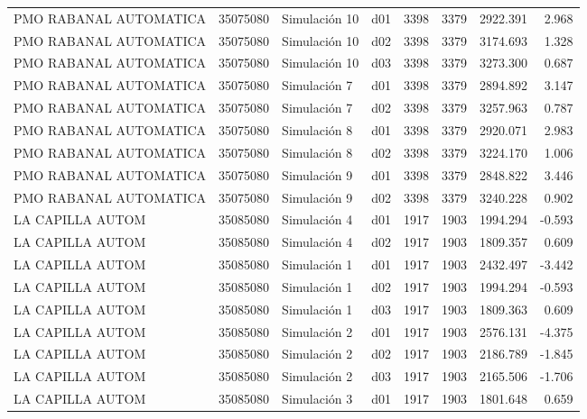\begin{landscape}
\begin{longtable}{lrlp{2cm}p{2cm}p{3cm}p{2cm}r}
  PMO RABANAL AUTOMATICA &  35075080 &  Simulación 10 &   d01 &      3398 &     3379 &  2922.391 &     2.968 \\
  PMO RABANAL AUTOMATICA &  35075080 &  Simulación 10 &   d02 &      3398 &     3379 &  3174.693 &     1.328 \\
  PMO RABANAL AUTOMATICA &  35075080 &  Simulación 10 &   d03 &      3398 &     3379 &  3273.300 &     0.687 \\
  PMO RABANAL AUTOMATICA &  35075080 &   Simulación 7 &   d01 &      3398 &     3379 &  2894.892 &     3.147 \\
  PMO RABANAL AUTOMATICA &  35075080 &   Simulación 7 &   d02 &      3398 &     3379 &  3257.963 &     0.787 \\
  PMO RABANAL AUTOMATICA &  35075080 &   Simulación 8 &   d01 &      3398 &     3379 &  2920.071 &     2.983 \\
  PMO RABANAL AUTOMATICA &  35075080 &   Simulación 8 &   d02 &      3398 &     3379 &  3224.170 &     1.006 \\
  PMO RABANAL AUTOMATICA &  35075080 &   Simulación 9 &   d01 &      3398 &     3379 &  2848.822 &     3.446 \\
  PMO RABANAL AUTOMATICA &  35075080 &   Simulación 9 &   d02 &      3398 &     3379 &  3240.228 &     0.902 \\
        LA CAPILLA AUTOM &  35085080 &   Simulación 4 &   d01 &      1917 &     1903 &  1994.294 &    -0.593 \\
        LA CAPILLA AUTOM &  35085080 &   Simulación 4 &   d02 &      1917 &     1903 &  1809.357 &     0.609 \\
        LA CAPILLA AUTOM &  35085080 &   Simulación 1 &   d01 &      1917 &     1903 &  2432.497 &    -3.442 \\
        LA CAPILLA AUTOM &  35085080 &   Simulación 1 &   d02 &      1917 &     1903 &  1994.294 &    -0.593 \\
        LA CAPILLA AUTOM &  35085080 &   Simulación 1 &   d03 &      1917 &     1903 &  1809.363 &     0.609 \\
        LA CAPILLA AUTOM &  35085080 &   Simulación 2 &   d01 &      1917 &     1903 &  2576.131 &    -4.375 \\
        LA CAPILLA AUTOM &  35085080 &   Simulación 2 &   d02 &      1917 &     1903 &  2186.789 &    -1.845 \\
        LA CAPILLA AUTOM &  35085080 &   Simulación 2 &   d03 &      1917 &     1903 &  2165.506 &    -1.706 \\
        LA CAPILLA AUTOM &  35085080 &   Simulación 3 &   d01 &      1917 &     1903 &  1801.648 &     0.659 \\

\end{longtable}
\end{landscape}
